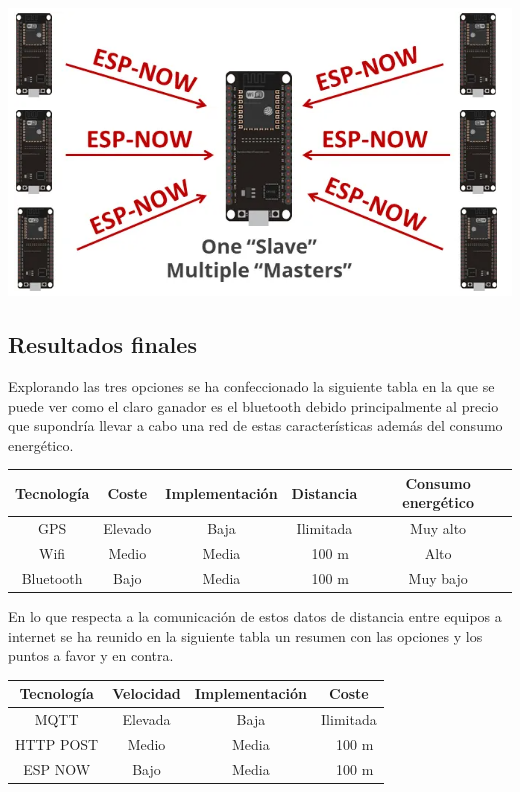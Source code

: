 \documentclass[a4paper ,12pt, onecolumn]{article}
\begin{document}
\begin{enumerate}
                \paragraph{}
                \includegraphics[scale=0.5]{espnow.png}
            \end{enumerate}
    \subsection{Resultados finales}
        Explorando las tres opciones se ha confeccionado la siguiente tabla en la que se puede ver como el claro ganador es el  bluetooth debido 
        principalmente al precio que supondría llevar a cabo una red de estas características además del consumo energético.
        \begin{center}
            \begin{tabular}{||c | c| c| c| c ||} 
            \hline
            Tecnología  & Coste  & Implementación & Distancia & Consumo energético \\ [0.5ex] 
            \hline
            GPS& Elevado& Baja & Ilimitada& Muy alto\\
            Wifi& Medio& Media & ~ 100 m & Alto\\ 
            Bluetooth& Bajo& Media & ~ 100 m & Muy bajo\\ 
            \hline
            \end{tabular}
        \end{center}   
        En lo que respecta a la comunicación de estos datos de distancia entre equipos a internet se ha reunido en la 
        siguiente tabla un resumen con las opciones y los puntos a favor y en contra.
        \begin{center}
            \begin{tabular}{||c | c| c| c||} 
            \hline
            Tecnología  & Velocidad  & Implementación & Coste \\ [0.5ex] 
            \hline
            MQTT& Elevada & Baja & Ilimitada\\
            HTTP POST& Medio& Media & ~ 100 m \\ 
            ESP NOW& Bajo& Media & ~ 100 m \\ 
            \hline
            \end{tabular}
        \end{center}   
\end{document}
